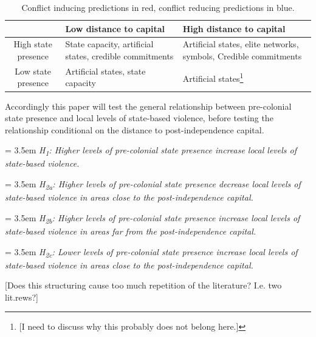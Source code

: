 \documentclass[12pt]{article}
\begin{document}
\begin{table}
\begin{tabularx}{\textwidth} { c | X | X }
	& Low distance to capital & High distance to capital \\ \hline
	High state presence & {\color{blue} State capacity, artificial states,
		credible commitments} & {\color{red} Artificial states, elite
			networks, symbols}, {\color{blue} Credible
				commitments} \\ \hline
	Low state presence & \color{red} Artificial states, state capacity &
		\color{red} Artificial states\footnote{[I need to discuss why
		this probably does not belong here.]}
\end{tabularx}
\caption{Conflict inducing predictions in {\color{red}red}, conflict reducing
predictions in {\color{blue}blue}.}
\label{twoXtwo}
\end{table}
	
Accordingly this paper will test the general relationship between pre-colonial
state presence and local levels of state-based violence, before testing the
relationship conditional on the distance to post-independence capital.

\bigskip
\hangindent = 3.5em \textit{H\textsubscript{1}: Higher levels of pre-colonial
	state presence increase local levels of state-based violence.}

\bigskip
\hangindent = 3.5em \textit{H\textsubscript{2a}: Higher levels of pre-colonial
	state presence decrease local levels of state-based violence in areas
	close to the post-independence capital.}

\bigskip
\hangindent = 3.5em \textit{H\textsubscript{2b}: Higher levels of pre-colonial
	state presence increase local levels of state-based violence in areas
	far from the post-independence capital.}

\bigskip
\hangindent = 3.5em \textit{H\textsubscript{2c}: Lower levels of pre-colonial
	state presence increase local levels of state-based violence in areas
	close to the post-independence capital.}

[Does this structuring cause too much repetition of the literature? I.e. two
lit.rews?] 
\end{document}
